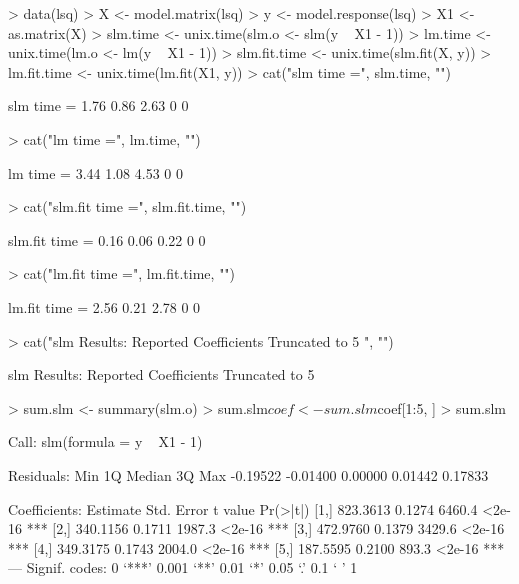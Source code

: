 \documentclass{article}
\begin{document}
\begin{Schunk}
\begin{Sinput}
> data(lsq)
> X <- model.matrix(lsq)
> y <- model.response(lsq)
> X1 <- as.matrix(X)
> slm.time <- unix.time(slm.o <- slm(y ~ X1 - 1))
> lm.time <- unix.time(lm.o <- lm(y ~ X1 - 1))
> slm.fit.time <- unix.time(slm.fit(X, y))
> lm.fit.time <- unix.time(lm.fit(X1, y))
> cat("slm time =", slm.time, "\n")
\end{Sinput}
\begin{Soutput}
slm time = 1.76 0.86 2.63 0 0 
\end{Soutput}
\begin{Sinput}
> cat("lm time =", lm.time, "\n")
\end{Sinput}
\begin{Soutput}
lm time = 3.44 1.08 4.53 0 0 
\end{Soutput}
\begin{Sinput}
> cat("slm.fit time =", slm.fit.time, "\n")
\end{Sinput}
\begin{Soutput}
slm.fit time = 0.16 0.06 0.22 0 0 
\end{Soutput}
\begin{Sinput}
> cat("lm.fit time =", lm.fit.time, "\n")
\end{Sinput}
\begin{Soutput}
lm.fit time = 2.56 0.21 2.78 0 0 
\end{Soutput}
\begin{Sinput}
> cat("slm Results: Reported Coefficients Truncated to 5  ", "\n")
\end{Sinput}
\begin{Soutput}
slm Results: Reported Coefficients Truncated to 5   
\end{Soutput}
\begin{Sinput}
> sum.slm <- summary(slm.o)
> sum.slm$coef <- sum.slm$coef[1:5, ]
> sum.slm
\end{Sinput}
\begin{Soutput}
Call:
slm(formula = y ~ X1 - 1)

Residuals:
     Min       1Q   Median       3Q      Max 
-0.19522 -0.01400  0.00000  0.01442  0.17833 

Coefficients:
     Estimate Std. Error t value Pr(>|t|)    
[1,] 823.3613     0.1274  6460.4   <2e-16 ***
[2,] 340.1156     0.1711  1987.3   <2e-16 ***
[3,] 472.9760     0.1379  3429.6   <2e-16 ***
[4,] 349.3175     0.1743  2004.0   <2e-16 ***
[5,] 187.5595     0.2100   893.3   <2e-16 ***
---
Signif. codes:  0 `***' 0.001 `**' 0.01 `*' 0.05 `.' 0.1 ` ' 1 


\end{Soutput}
\end{Schunk}
\end{document}
